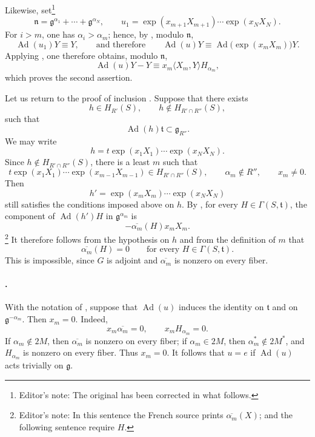 Likewise, set\footnote{Editor's note: The original has been corrected
in what follows.}
\[
  \mathfrak n
  =
  \mathfrak g^{\alpha_1}+\cdots+\mathfrak g^{\alpha_N},
  \qquad
  u_1
  =
  \exp(x_{m+1}X_{m+1})\cdots\exp(x_NX_N).
\]
For \(i>m\), one has \(\alpha_i>\alpha_m\); hence, by , modulo
\(\mathfrak n\),
\[
  \operatorname{Ad}(u_1)Y\equiv Y,
  \qquad\text{and therefore}\qquad
  \operatorname{Ad}(u)Y
  \equiv
  \operatorname{Ad}\bigl(\exp(x_mX_m)\bigr)Y.
\]
Applying , one therefore obtains, modulo
\(\mathfrak n\),
\[
  \operatorname{Ad}(u)Y-Y
  \equiv
  x_m\langle X_m,Y\rangle H_{\alpha_m},
\]
which proves the second assertion.

Let us return to the proof of inclusion \textup{}. Suppose that
there exists
\[
  h\in H_{R'}(S),
  \qquad
  h\notin H_{R'\cap R''}(S),
\]
such that
\[
  \operatorname{Ad}(h)\mathfrak t\subset\mathfrak g_{R''}.
\]
We may write
\[
  h=t\exp(x_1X_1)\cdots\exp(x_NX_N).
\]
Since \(h\notin H_{R'\cap R''}(S)\), there is a least \(m\) such
that
\[
  t\exp(x_1X_1)\cdots\exp(x_{m-1}X_{m-1})
  \in H_{R'\cap R''}(S),
  \qquad
  \alpha_m\notin R'',
  \qquad
  x_m\neq0.
\]
Then
\[
  h'=\exp(x_mX_m)\cdots\exp(x_NX_N)
\]
still satisfies the conditions imposed above on \(h\). By , for every \(H\in\Gamma(S,\mathfrak t)\), the component of
\(\operatorname{Ad}(h')H\) in \(\mathfrak g^{\alpha_m}\) is
\[
  -\overline{\alpha_m}(H)x_mX_m.
\]
\footnote{Editor's note: In this sentence the French source prints
\(\overline{\alpha_m}(X)\); \textup{} and the following
sentence require \(H\).}
It therefore follows from the hypothesis on \(h\) and from the
definition of \(m\) that
\[
  \overline{\alpha_m}(H)=0
  \qquad\text{for every }H\in\Gamma(S,\mathfrak t).
\]
This is impossible, since \(G\) is adjoint and
\(\overline{\alpha_m}\) is nonzero on every fiber.

\paragraph{.}
With the notation of , suppose that
\(\operatorname{Ad}(u)\) induces the identity on \(\mathfrak t\) and
on \(\mathfrak g^{-\alpha_m}\). Then \(x_m=0\). Indeed,
\[
  x_m\overline{\alpha_m}=0,
  \qquad
  x_mH_{\alpha_m}=0.
\]
If \(\alpha_m\notin2M\), then \(\overline{\alpha_m}\) is nonzero on
every fiber; if \(\alpha_m\in2M\), then
\(\alpha_m^\ast\notin2M^\ast\), and \(H_{\alpha_m}\) is nonzero on
every fiber. Thus \(x_m=0\). It follows that \(u=e\) if
\(\operatorname{Ad}(u)\) acts trivially on \(\mathfrak g\).

